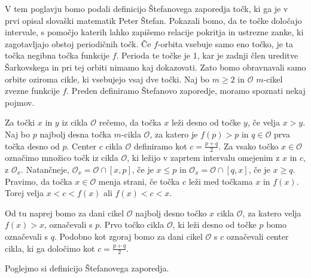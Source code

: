 \documentclass[../TG_magistrsko_delo_sections.tex]{subfiles}
\begin{document}
V tem poglavju bomo podali definicijo Štefanovega zaporedja točk, ki ga je v~\cite{Stefan} prvi opisal slovaški matematik Peter Štefan. Pokazali bomo, da te točke določajo intervale, s pomočjo katerih lahko zapišemo relacije pokritja in ustrezne zanke, ki zagotavljajo obstoj periodičnih točk. 
Če $f$-orbita vsebuje samo eno točko, je ta točka negibna točka funkcije $f$. Perioda te točke je 1, kar je zadnji člen ureditve Šarkovskega in pri tej orbiti nimamo kaj dokazovati. Zato bomo obravnavali samo orbite oziroma cikle, ki vsebujejo vsaj dve točki. Naj bo $m \geq 2$ in $\mathcal{O}$ $m$-cikel zvezne funkcije $f$. Preden definiramo Štefanovo zaporedje, moramo spoznati nekaj pojmov. 

\begin{definicija}
Za točki $x$ in $y$ iz cikla $\mathcal{O}$  rečemo, da točka $x$ leži desno od točke $y$, če velja $x > y$. Naj bo $p$ najbolj desna točka $m$-cikla $\mathcal{O}$, za katero je $f(p) > p$ in $q\in \mathcal{O}$ prva točka desno od $p$. Center $c$ cikla $\mathcal{O}$ definiramo kot $c=\frac{p+q}{2}$. Za vsako točko $x \in \mathcal{O}$ označimo množico točk iz cikla $\mathcal{O}$, ki ležijo v zaprtem intervalu omejenim z $x$ in $c$, z $\mathcal{O}_x$. Natančneje, $\mathcal{O}_x = \mathcal{O} \cap [x, p]$, če je $x \leq p$ in  $\mathcal{O}_x = \mathcal{O} \cap [q, x]$, če je $x \geq q$. Pravimo, da točka $x \in \mathcal{O}$ menja strani, če točka $c$ leži med točkama $x$ in $f(x)$. Torej velja $x < c < f(x)$ ali $f(x) < c < x$.
\end{definicija}
Od tu naprej bomo za dani cikel $\mathcal{O}$ najbolj desno točko $x$ cikla $\mathcal{O}$, za katero velja $f(x) > x$, označevali s $p$. Prvo točko cikla $\mathcal{O}$, ki leži desno od točke $p$ bomo označevali s $q$. Podobno kot zgoraj bomo za dani cikel $\mathcal{O}$ s $c$ označevali center cikla, ki ga določimo kot $c=\frac{p+q}{2}$.

Poglejmo si definicijo Štefanovega zaporedja.
\end{document}
